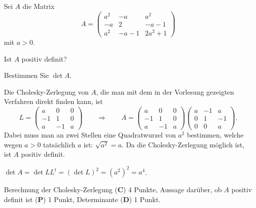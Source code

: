 %
Sei $A$ die Matrix
\[
A
=
\begin{pmatrix}
a^2     &   -a    &   a^2    \\
-a      &    2    & -a-1     \\
a^2     &  -a-1   & 2a^2 + 1
\end{pmatrix}
\]
mit $a>0$.
\begin{teilaufgaben}
\item
Ist $A$ positiv definit?
\item
Bestimmen Sie $\det A$.
\end{teilaufgaben}


\begin{loesung}
\begin{teilaufgaben}
\item
Die Cholesky-Zerlegung von $A$, die man mit dem in der Vorlesung
gezeigten Verfahren direkt finden kann, ist
\[
L=
\begin{pmatrix}
 a& 0& 0\\
-1& 1& 0\\
 a&-1& a
\end{pmatrix}
\qquad\Rightarrow\qquad
A
=
\begin{pmatrix}
 a& 0& 0\\
-1& 1& 0\\
 a&-1& a
\end{pmatrix}
\begin{pmatrix}
 a&-1& a\\
 0& 1&-1\\
 0& 0& a
\end{pmatrix}.
\]
Dabei muss man an zwei Stellen eine Quadratwurzel von $a^2$ bestimmen,
welche wegen $a>0$ tatsächlich $a$ ist: $\sqrt{a^2}=a$.
Da die Cholesky-Zerlegung möglich ist, ist $A$ positiv definit.
\item
$\det A = \det LL^t =(\det L)^2 = (a^2)^2 = a^4$.
\qedhere
\end{teilaufgaben}
\end{loesung}

\begin{bewertung}
Berechnung der Cholesky-Zerlegung ({\bf C}) 4 Punkte,
Aussage darüber, ob $A$ positiv definit ist ({\bf P}) 1 Punkt,
Determinante ({\bf D}) 1 Punkt.
\end{bewertung}
